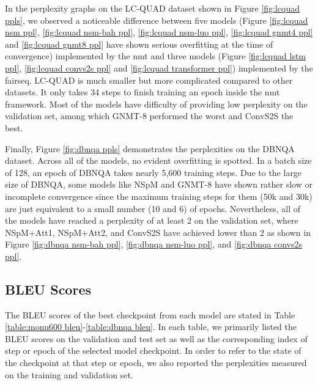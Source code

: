 In the perplexity graphs on the LC-QUAD dataset shown in Figure \ref{fig:lcquad ppls}, we observed a noticeable difference between five models (Figure \ref{fig:lcquad nsm ppl}, \ref{fig:lcquad nsm-bah ppl}, \ref{fig:lcquad nsm-luo ppl}, \ref{fig:lcquad gnmt4 ppl} and \ref{fig:lcquad gnmt8 ppl} have shown serious overfitting at the time of convergence) implemented by the nmt and three models (Figure \ref{fig:lcquad lstm ppl}, \ref{fig:lcquad convs2s ppl} and \ref{fig:lcquad transformer ppl}) implemented by the fairseq. LC-QUAD is much smaller but more complicated compared to other datasets. It only takes 34 steps to finish training an epoch inside the nmt framework. Most of the models have difficulty of providing low perplexity on the validation set, among which GNMT-8 performed the worst and ConvS2S the best. 

Finally, Figure \ref{fig:dbnqa ppls} demonstrates the perplexities on the DBNQA dataset. Across all of the models, no evident overfitting is spotted. In a batch size of 128, an epoch of DBNQA takes nearly 5,600 training steps. Due to the large size of DBNQA, some models like NSpM and GNMT-8 have shown rather slow or incomplete convergence since the maximum training steps for them (50k and 30k) are just equivalent to a small number (10 and 6) of epochs. Nevertheless, all of the models have reached a perplexity of at least 2 on the validation set, where NSpM+Att1, NSpM+Att2, and ConvS2S have achieved lower than 2 as shown in Figure \ref{fig:dbnqa nsm-bah ppl}, \ref{fig:dbnqa nsm-luo ppl}, and \ref{fig:dbnqa convs2s ppl}.


\subsection{BLEU Scores}

The BLEU scores of the best checkpoint from each model are stated in Table \ref{table:monu600 bleu}-\ref{table:dbnqa bleu}. In each table, we primarily listed the BLEU scores on the validation and test set as well as the corresponding index of step or epoch of the selected model checkpoint. In order to refer to the state of the checkpoint at that step or epoch, we also reported the perplexities measured on the training and validation set.

